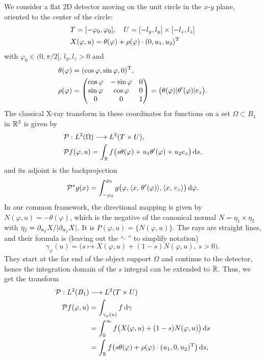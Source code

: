 \documentclass{amsart}
\renewcommand*{\phi}{\varphi}
\begin{document}
We consider a flat 2D detector moving on the unit circle in the $x$-$y$ plane, oriented to the center of the circle:
%
\begin{align*}
 & T = [-\phi_0, \phi_0],\quad U = [-l_y, l_y] \times [-l_z, l_z] \\
 & X(\phi, u) = \theta(\phi) + \rho(\phi) \cdot \TRANSP{(0, u_1, u_2)}
\end{align*}
%
with $\phi_0 \in (0, \pi/2]$, $l_y, l_z > 0$ and
%
\begin{align}
 \theta(\phi) &= \TRANSP{(\cos\phi, \sin\phi, 0)}, \\ 
 \rho(\phi) &=
 \begin{pmatrix}
  \cos\phi & -\sin\phi & 0 \\
  \sin\phi & \cos\phi & 0 \\
  0 & 0 & 1
 \end{pmatrix}
 = \big(\theta(\phi) | \theta'(\phi) | e_z\big).
\end{align}
%
The classical X-ray transform in these coordinates for functions on a set $\Omega \subset B_1$ in ${\mathbb{R}}^3$ is given by
%
\begin{align}
 &\OPP: L^2(\Omega) \Lto L^2(T \times U), \notag \\
 \label{eq:parflat:fwdproj}
 &\OPP f(\phi, u) = \int_\RR f\big(s\theta(\phi) + u_1 \theta'(\phi) + u_2 e_z\big)\, \D s,
\end{align}
%
and its adjoint is the backprojection
%
\begin{equation}
 \label{eq:parflat:backproj}
 \DUALOPP g(x) = \int_{-\phi_0}^{\phi_0} g\big(\phi, \INNER{x}{\theta'(\phi)}, \INNER{x}{e_z}\big)\, \D \phi.
\end{equation}
%
In our common framework, the directional mapping is given by $N(\phi, u) = -\theta(\phi)$, which is the negative of the canonical normal 
$N = \eta_1 \times \eta_2$ with $\eta_j = \partial_{u_j} X / |\partial_{u_j} X|$. It is $P(\phi, u) = \lbrace N(\phi, u)\rbrace$.
The rays are straight lines, and their formula is (leaving out the ``$\,\widetilde{\ }\,$'' to simplify notation)
%
\begin{equation*}
 \gamma_\phi(u) = \big( s \mapsto X(\phi, u) + (1-s) N(\phi, u),\ s > 0 \big).
\end{equation*}
%
They start at the far end of the object support $\Omega$ and continue to the detector, hence the integration domain of the $s$ 
integral can be extended to ${\mathbb{R}}$. Thus, we get the transform
%
\begin{align*}
 \OPP: L^2(B_1) & \Lto L^2(T \times U) \\
 \OPP f(\phi, u) 
 &= \int_{\gamma_\phi(u)} f\, \D \gamma \\
 &= \int_0^\infty f\big(X(\phi, u) + (1-s) N(\phi, u)\big)\, \D s \\
 &= \int_\RR f\big(s \theta(\phi) + \rho(\phi) \cdot \TRANSP{(u_1, 0, u_2)}\big)\, \D s,
\end{align*}
\end{document}
